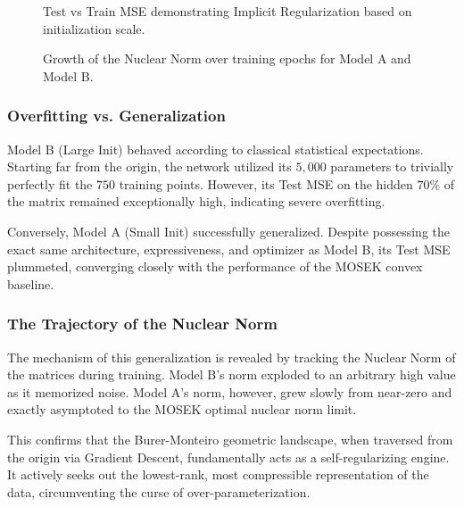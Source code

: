 \begin{figure}[htbp]
  \centering
  \caption{Test vs Train MSE demonstrating Implicit Regularization based on initialization scale.}
  \label{fig:implicit_reg}
\end{figure}

\begin{figure}[htbp]
  \centering
  \caption{Growth of the Nuclear Norm over training epochs for Model A and Model B.}
  \label{fig:nuclear_norm}
\end{figure}

\subsubsection{Overfitting vs. Generalization}
Model B (Large Init) behaved according to classical statistical expectations. Starting far from the origin, the network utilized its $5,000$ parameters to trivially perfectly fit the $750$ training points. However, its Test MSE on the hidden $70\%$ of the matrix remained exceptionally high, indicating severe overfitting. 

Conversely, Model A (Small Init) successfully generalized. Despite possessing the exact same architecture, expressiveness, and optimizer as Model B, its Test MSE plummeted, converging closely with the performance of the MOSEK convex baseline. 

\subsubsection{The Trajectory of the Nuclear Norm}
The mechanism of this generalization is revealed by tracking the Nuclear Norm of the matrices during training. Model B's norm exploded to an arbitrary high value as it memorized noise. Model A's norm, however, grew slowly from near-zero and exactly asymptoted to the MOSEK optimal nuclear norm limit. 

This confirms that the Burer-Monteiro geometric landscape, when traversed from the origin via Gradient Descent, fundamentally acts as a self-regularizing engine. It actively seeks out the lowest-rank, most compressible representation of the data, circumventing the curse of over-parameterization.


